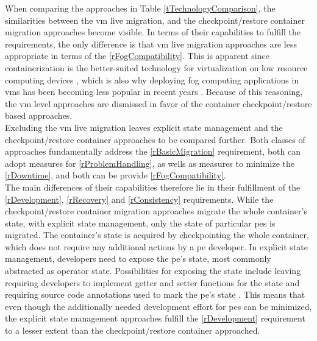 
When comparing the approaches in Table \ref{tTechnologyComparison}, the similarities between the \gls{vm} live migration, and the checkpoint/restore container migration approaches become visible. In terms of their capabilities to fulfill the requirements, the only difference is that \gls{vm} live migration approaches are less appropriate in terms of the \ref{rFogCompatibility}. This is apparent since containerization is the better-suited technology for virtualization on low resource computing devices \cite{Jalali.2016}, which is also why deploying fog computing applications in \gls{vm}s has been becoming less popular in recent years \cite{Puliafito.2018}. Because of this reasoning, the \gls{vm} level approaches are dismissed in favor of the container checkpoint/restore based approaches.\\
Excluding the \gls{vm} live migration leaves explicit state management and the checkpoint/restore container approaches to be compared further. Both classes of approaches fundamentally address the \ref{rBasicMigration} requirement, both can adopt measures for \ref{rProblemHandling}, as wells as measures to minimize the \ref{rDowntime}, and both can be provide \ref{rFogCompatibility}.\\ 
The main differences of their capabilities therefore lie in their fulfillment of the \ref{rDevelopment}, \ref{rRecovery} and \ref{rConsistency} requirements. While the checkpoint/restore container migration approaches migrate the whole container's state, with explicit state management, only the state of particular \gls{pe}s is migrated. The container's state is acquired by checkpointing the whole container, which does not require any additional actions by a \gls{pe} developer. In explicit state management, developers need to expose the \gls{pe}'s state, most commonly abstracted as operator state. Possibilities for exposing the state include leaving requiring developers to implement getter and setter functions for the state \cite{CastroFernandez.2013, Saurez.2016} and requiring source code annotations used to mark the \gls{pe}'s state \cite{Gibson.2014}. This means that even though the additionally needed development effort for \gls{pe}s can be minimized, the explicit state management approaches fulfill the \ref{rDevelopment} requirement to a lesser extent than the checkpoint/restore container approached.\\
